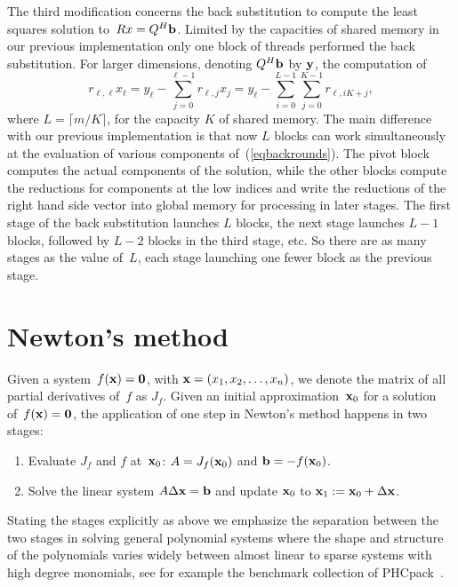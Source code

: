 \documentclass{article}
\newcommand\x{{\bf x}}
\newcommand\y{{\bf y}}
\newcommand\bfb{{\bf b}}
\newcommand\zero{{\bf 0}}
\begin{document}
The third modification concerns the back substitution 
to compute the least squares solution to~$R x = Q^H \bfb$.
Limited by the capacities of shared memory in our previous implementation
only one block of threads performed the back substitution.
For larger dimensions, denoting $Q^H \bfb$ by $\y$, the computation of
\begin{equation} \label{eqbackrounds}
   r_{\ell, \ell} x_\ell = y_\ell - \sum_{j=0}^{\ell - 1} r_{\ell, j} x_j
   = y_\ell - \sum_{i=0}^{L-1} \sum_{j = 0}^{K-1} r_{\ell, i K + j},
\end{equation}
where $L = \lceil m/K \rceil$, for the capacity $K$ of shared memory.
The main difference with our previous implementation is that now $L$
blocks can work simultaneously at the evaluation of various components
of~(\ref{eqbackrounds}).  The pivot block computes the actual components
of the solution, while the other blocks compute the reductions for
components at the low indices and write the reductions of the right
hand side vector into global memory for processing in later stages.
The first stage of the back substitution launches $L$ blocks,
the next stage launches $L-1$ blocks, followed by $L-2$ blocks
in the third stage, etc.  So there are as many stages as the value of~$L$,
each stage launching one fewer block as the previous stage.

\section{Newton's method}

Given a system~$f(\x) = \zero$, with $\x = (x_1, x_2, \ldots, x_n)$,
we denote the matrix of all partial derivatives of~$f$ as $J_f$.
Given an initial approximation~$\x_0$ for a solution of~$f(\x) = \zero$,
the application of one step in Newton's method happens in two stages:
\begin{enumerate}
\item Evaluate $J_f$ and $f$ at~$\x_0$:
      $A = J_f(\x_0)$ and $\bfb = -f(\x_0)$.
\item Solve the linear system $A \Delta \x = \bfb$
      and update $\x_0$ to $\x_1 :=  \x_0 + \Delta \x$.
\end{enumerate}
Stating the stages explicitly as above we emphasize the separation
between the two stages in solving general polynomial systems where
the shape and structure of the polynomials varies widely between
almost linear to sparse systems with high degree monomials,
see for example the benchmark collection of PHCpack~\cite{Ver99}.
\end{document}
